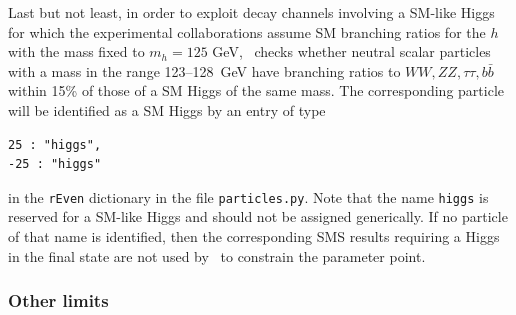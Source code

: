 \documentclass[12pt,a4paper]{article}
\begin{document}
Last but not least, in order to  exploit decay channels involving a SM-like Higgs for which the experimental collaborations assume  
SM branching ratios for the $h$ with the mass fixed to $m_h=125$ GeV, \micro\ checks whether  
neutral scalar particles with a mass in the range 123--128~GeV have branching ratios to $WW,ZZ,\tau\tau, b\bar{b}$ within 15\% of those of a SM Higgs of the same mass. 
The corresponding particle will be identified as a SM Higgs 
by an entry of type
\begin{verbatim}
25 : "higgs",
-25 : "higgs"
\end{verbatim}
in the {\tt rEven} dictionary in the file {\tt particles.py}.    
Note that the name {\tt higgs} is reserved for a SM-like Higgs and should not be assigned generically. 
If no particle of that name is identified,  then the corresponding SMS results requiring a Higgs in the final state are not used by \smodels\ to constrain the parameter point.




\subsubsection{Other limits}
\end{document}

